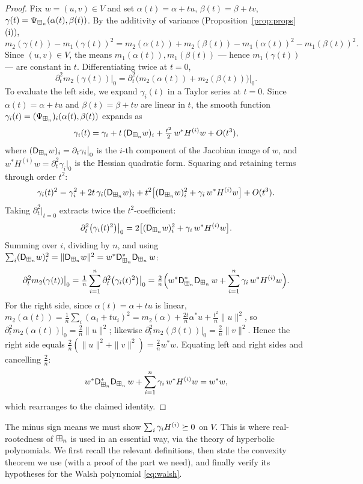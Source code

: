 \begin{proof}
Fix $w=(u,v)\in V$ and set $\alpha(t)=\alpha+tu$, $\beta(t)=\beta+tv$,
$\gamma(t)=\Psi_{\boxplus_n}(\alpha(t),\beta(t))$. By the additivity of variance
(Proposition~\ref{prop:props}(i)),
\[
m_2(\gamma(t))-m_1(\gamma(t))^2
=m_2(\alpha(t))+m_2(\beta(t))-m_1(\alpha(t))^2-m_1(\beta(t))^2 .
\]
Since $(u,v)\in V$, the means $m_1(\alpha(t)),m_1(\beta(t))$ — hence
$m_1(\gamma(t))$ — are constant in $t$. Differentiating twice at $t=0$,
\[
\partial_t^2 m_2(\gamma(t))\big|_0=\partial_t^2\bigl(m_2(\alpha(t))+m_2(\beta(t))\bigr)\big|_0 .
\]
To evaluate the left side, we expand $\gamma_i(t)$ in a Taylor series at $t=0$.
Since $\alpha(t)=\alpha+tu$ and $\beta(t)=\beta+tv$ are linear in $t$, the smooth
function $\gamma_i(t)=(\Psi_{\boxplus_n})_i(\alpha(t),\beta(t))$ expands as
\[
\gamma_i(t) = \gamma_i + t\,(\mathsf{D}_{\boxplus_n} w)_i + \tfrac{t^2}{2}\,w^\ast H^{(i)}w + O(t^3),
\]
where $(\mathsf{D}_{\boxplus_n} w)_i = \partial_t\gamma_i\big|_0$ is the $i$-th component of the
Jacobian image of $w$, and $w^\ast H^{(i)}w = \partial_t^2\gamma_i\big|_0$ is the
Hessian quadratic form. Squaring and retaining terms through order $t^2$:
\[
\gamma_i(t)^2 = \gamma_i^2 + 2t\,\gamma_i(\mathsf{D}_{\boxplus_n} w)_i
  + t^2\bigl[(\mathsf{D}_{\boxplus_n} w)_i^2 + \gamma_i\,w^\ast H^{(i)}w\bigr] + O(t^3).
\]
Taking $\partial_t^2\big|_{t=0}$ extracts twice the $t^2$-coefficient:
\[
\partial_t^2\bigl(\gamma_i(t)^2\bigr)\big|_0
  = 2\bigl[(\mathsf{D}_{\boxplus_n} w)_i^2 + \gamma_i\,w^\ast H^{(i)}w\bigr].
\]
Summing over $i$, dividing by $n$, and using $\sum_i(\mathsf{D}_{\boxplus_n} w)_i^2
=\|\mathsf{D}_{\boxplus_n} w\|^2=w^\ast\mathsf{D}_{\boxplus_n}^\ast\mathsf{D}_{\boxplus_n}\,w$:
\[
\partial_t^2 m_2(\gamma(t))\big|_0
  = \tfrac{1}{n}\sum_{i=1}^n \partial_t^2\bigl(\gamma_i(t)^2\bigr)\big|_0
  = \tfrac{2}{n}\Bigl(w^\ast\mathsf{D}_{\boxplus_n}^\ast\mathsf{D}_{\boxplus_n}\,w
    + \sum_{i=1}^n\gamma_i\,w^\ast H^{(i)}w\Bigr).
\]
For the right side, since $\alpha(t)=\alpha+tu$ is linear,
$m_2(\alpha(t))=\tfrac1n\sum_i(\alpha_i+tu_i)^2
=m_2(\alpha)+\tfrac{2t}{n}\alpha^\ast u+\tfrac{t^2}{n}\|u\|^2$,
so $\partial_t^2 m_2(\alpha(t))\big|_0=\tfrac{2}{n}\|u\|^2$;
likewise $\partial_t^2 m_2(\beta(t))\big|_0=\tfrac{2}{n}\|v\|^2$.
Hence the right side equals $\tfrac{2}{n}(\|u\|^2+\|v\|^2)=\tfrac{2}{n}w^\ast w$.
Equating left and right sides and cancelling $\tfrac{2}{n}$:
\[
w^\ast\mathsf{D}_{\boxplus_n}^\ast\mathsf{D}_{\boxplus_n}\,w + \sum_{i=1}^n\gamma_i\,w^\ast H^{(i)}w = w^\ast w,
\]
which rearranges to the claimed identity.
\end{proof}

The minus sign means we must show $\sum_i\gamma_i H^{(i)}\succeq 0$ on $V$. This is
where real-rootedness of $\boxplus_n$ is used in an essential way, via the theory of
hyperbolic polynomials. We first recall the relevant definitions, then state the
convexity theorem we use (with a proof of the part we need), and finally verify
its hypotheses for the Walsh polynomial \eqref{eq:walsh}.

